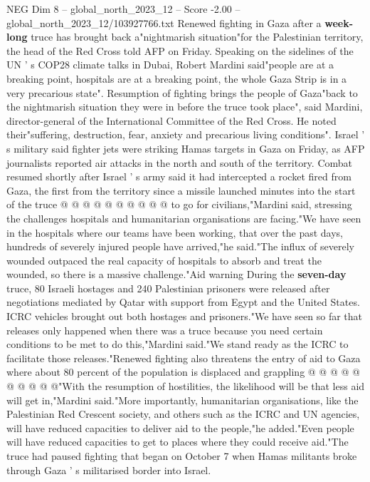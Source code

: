 \begin{textsample}{NEG Dim 8 – global\_north\_2023\_12 – Score -2.00 – global\_north\_2023\_12/103927766.txt}  \label{ex:f8_neg_168}
Renewed fighting in Gaza after a \textbf{week-long} truce has brought back a"nightmarish situation"for the Palestinian territory, the head of the Red Cross told AFP on Friday.
Speaking on the sidelines of the UN ' s COP28 climate talks in Dubai, Robert Mardini said"people are at a breaking point, hospitals are at a breaking point, the whole Gaza Strip is in a very precarious state".
Resumption of fighting brings the people of Gaza"back to the nightmarish situation they were in before the truce took place", said Mardini, director-general of the International Committee of the Red Cross.
He noted their"suffering, destruction, fear, anxiety and precarious living conditions".
Israel ' s military said fighter jets were striking Hamas targets in Gaza on Friday, as AFP journalists reported air attacks in the north and south of the territory.
Combat resumed shortly after Israel ' s army said it had intercepted a rocket fired from Gaza, the first from the territory since a missile launched minutes into the start of the truce @ @ @ @ @ @ @ @ @ @ to go for civilians,"Mardini said, stressing the challenges hospitals and humanitarian organisations are facing."We have seen in the hospitals where our teams have been working, that over the past days, hundreds of severely injured people have arrived,"he said."The influx of severely wounded outpaced the real capacity of hospitals to absorb and treat the wounded, so there is a massive challenge."Aid warning During the \textbf{seven-day} truce, 80 Israeli hostages and 240 Palestinian prisoners were released after negotiations mediated by Qatar with support from Egypt and the United States.
ICRC vehicles brought out both hostages and prisoners."We have seen so far that releases only happened when there was a truce because you need certain conditions to be met to do this,"Mardini said."We stand ready as the ICRC to facilitate those releases."Renewed fighting also threatens the entry of aid to Gaza where about 80 percent of the population is displaced and grappling @ @ @ @ @ @ @ @ @ @"With the resumption of hostilities, the likelihood will be that less aid will get in,"Mardini said."More importantly, humanitarian organisations, like the Palestinian Red Crescent society, and others such as the ICRC and UN agencies, will have reduced capacities to deliver aid to the people,"he added."Even people will have reduced capacities to get to places where they could receive aid."The truce had paused fighting that began on October 7 when Hamas militants broke through Gaza ' s militarised border into Israel.

\end{textsample}
